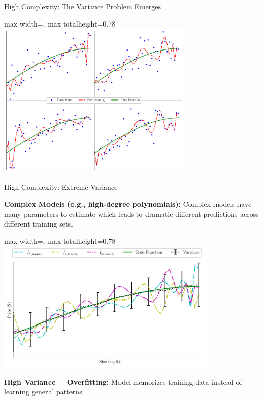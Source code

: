 \documentclass[10pt]{beamer}
\newcommand{\fitpic}[1]{\begin{adjustbox}{max width=\linewidth, max totalheight=0.78\textheight}#1\end{adjustbox}}
\begin{document}
\begin{frame}{High Complexity: The Variance Problem Emerges}
\begin{center}
\fitpic{\includegraphics[width=0.7\textwidth]{../assets/bias-variance/figures/var3.pdf}}
\end{center}


\end{frame}

\begin{frame}{High Complexity: Extreme Variance}
\begin{keypointsbox}
\textbf{Complex Models (e.g., high-degree polynomials):} Complex models have  many parameters to estimate which leads to dramatic different predictions across different training sets.

\end{keypointsbox}

\begin{center}
\fitpic{\includegraphics[width=0.8\textwidth]{../assets/bias-variance/figures/var4.pdf}}
\end{center}

\begin{alertbox}
\textbf{High Variance = Overfitting:} Model memorizes training data instead of learning general patterns
\end{alertbox}
\end{frame}
\end{document}
